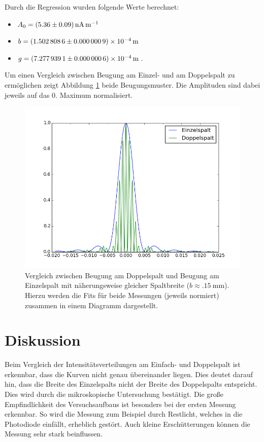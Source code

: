 \documentclass[11pt,ngerman,a4paper]{article}
\begin{document}
Durch die Regression wurden folgende Werte berechnet:
\begin{itemize}
\item $A_0 = \SI{5.36+-0.09}{\nano\ampere\per\meter}$
\item $b = \SI{1.5028086+-0.0000009e-4}{\meter}$
\item $g = \SI{7.2779391+-0.0000006e-4}{\meter}$.
\end{itemize}
Um einen Vergleich zwischen Beugung am Einzel- und am Doppelspalt zu ermöglichen zeigt Abbildung \ref{plot3} beide Beugungsmuster. Die Amplituden sind dabei jeweils auf das 0. Maximum normalisiert.
\begin{figure}[htp]
\centering
\includegraphics[scale=0.8]{plot4.png}
\caption{Vergleich zwischen Beugung am Doppelspalt und Beugung am Einzelspalt mit näherungsweise gleicher Spaltbreite ($b \approx \SI{.15}{\milli\meter}$). Hierzu werden die Fits für beide Messungen (jeweils normiert) zusammen in einem Diagramm dargestellt.}
\label{plot3}
\end{figure}

\section{Diskussion}

Beim Vergleich der Intensitätsverteilungen am Einfach- und Doppelspalt ist erkennbar, dass die Kurven nicht genau übereinander liegen. Dies deutet darauf hin, dass die Breite des Einzelspalts nicht der Breite des Doppelspalts entspricht. Dies wird durch die mikroskopische Untersuchung bestätigt. 
Die große Empfindlichkeit des Versuchsaufbaus ist besonders bei der ersten Messung erkennbar. So wird die Messung zum Beispiel durch Restlicht, welches in die Photodiode einfällt, erheblich gestört. Auch kleine Erschütterungen können die Messung sehr stark beinflussen.
\end{document}
